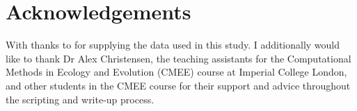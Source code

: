 \documentclass[11pt]{article}
\begin{document}
	\section{Acknowledgements}
	
	With thanks to \cite{roth1962continuity, stannard1985temperature, phillips1987relation, sivonen1990effects, gill1991growth, zwietering1994modeling, bae2014growth, galarz2016predicting, bernhardt2018metabolic, silva2018modelling} for supplying the data used in this study. I additionally would like to thank Dr Alex Christensen, the teaching assistants for the Computational Methods in Ecology and Evolution (CMEE) course at Imperial College London, and other students in the CMEE course for their support and advice throughout the scripting and write-up process.
	
	
	
\end{document}
